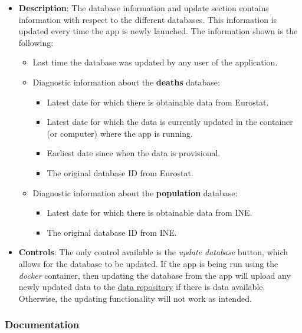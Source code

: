 \documentclass[
  a4paper]{article}
\providecommand{\tightlist}{%
  \setlength{\itemsep}{0pt}\setlength{\parskip}{0pt}}
\begin{document}
\begin{itemize}
\item
  \textbf{Description}: The database information and update section
  contains information with respect to the different databases. This
  information is updated every time the app is newly launched. The
  information shown is the following:

  \begin{itemize}
  \tightlist
  \item
    Last time the database was updated by any user of the application.
  \item
    Diagnostic information about the \textbf{deaths} database:

    \begin{itemize}
    \tightlist
    \item
      Latest date for which there is obtainable data from Eurostat.
    \item
      Latest date for which the data is currently updated in the
      container (or computer) where the app is running.
    \item
      Earliest date since when the data is provisional.
    \item
      The original database ID from Eurostat.
    \end{itemize}
  \item
    Diagnostic information about the \textbf{population} database:

    \begin{itemize}
    \tightlist
    \item
      Latest date for which there is obtainable data from INE.
    \item
      The original database ID from INE.
    \end{itemize}
  \end{itemize}
\item
  \textbf{Controls}: The only control available is the \emph{update
  database} button, which allows for the database to be updated. If the
  app is being run using the \emph{docker} container, then updating the
  database from the app will upload any newly updated data to the
  \href{https://github.com/dreth/tfm_uc3m_data}{data repository} if
  there is data available. Otherwise, the updating functionality will
  not work as intended.
\end{itemize}

\hypertarget{DocsLayout}{%
\subsubsection{Documentation}\label{DocsLayout}}
\end{document}
